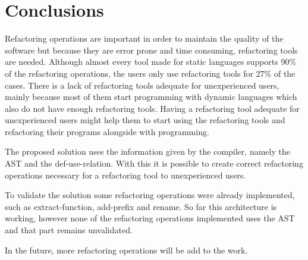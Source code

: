 
% 
% 

\section{Conclusions}


Refactoring operations are important in order to maintain the quality of the software but because they are error prone and time consuming, refactoring tools are needed.
Although almost every tool made for static languages supports 90\% of the refactoring operations, the users only use refactoring tools for 27\% of the cases. 
There is a lack of refactoring tools adequate for unexperienced users, mainly because most of them start programming with dynamic languages which also do not have enough refactoring tools.
Having a refactoring tool adequate for unexperienced users might help them to start using the refactoring tools and refactoring their programs alongside with programming.

The proposed solution uses the information given by the compiler, namely the AST and the def-use-relation. With this it is possible to create correct refactoring operations necessary for a refactoring tool to unexperienced users.


To validate the solution some refactoring operations were already implemented, such as extract-function, add-prefix and rename. 
So far this architecture is working, however none of the refactoring operations implemented uses the AST and that part remains unvalidated.

In the future, more refactoring operations will be add to the work.







